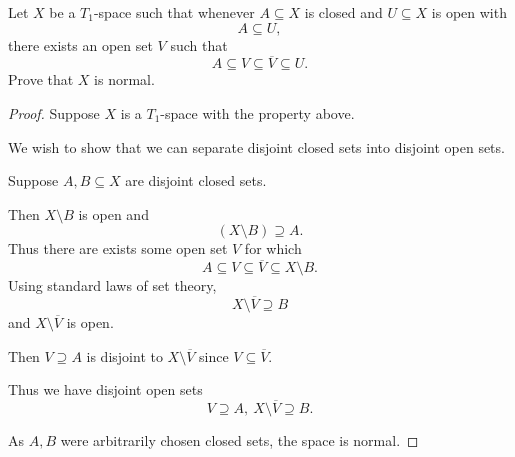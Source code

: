 \documentclass[11pt]{article}
\begin{document}
\begin{prob}
    Let $X$ be a $T_1$-space such that 
    whenever $A \subseteq X$ is closed and 
    $U \subseteq X$ is open with 
    \[
        A \subseteq U, 
    \]
    there exists an open set $V$ such that 
    \[
        A \subseteq V \subseteq \overline V 
        \subseteq U. 
    \]
    Prove that $X$ is normal. 
\end{prob}
\begin{proof}
    Suppose $X$ is a $T_1$-space with the 
    property above. 

    We wish to show that we can separate 
    disjoint closed sets into 
    disjoint open sets.

    Suppose $A,B \subseteq X$ are disjoint 
    closed sets. 
    
    Then $X \setminus B$ is open and 
    \[
        (X\setminus B) \supseteq A. 
    \]
    Thus there are exists some open set 
    $V$ for which 
    \[
        A \subseteq V \subseteq \overline V 
        \subseteq X\setminus B. 
    \]
    Using standard laws of set theory, 
    \[
        X \setminus \overline V 
        \supseteq B 
    \]
    and $X \setminus \overline V$ is open. 

    Then $V \supseteq A$ is disjoint 
    to $X \setminus \overline V$ since $V \subseteq \overline V$. 

    Thus we have disjoint open sets 
    \[
        V \supseteq A, \ X \setminus \overline V \supseteq 
        B. 
    \]
    
    As $A,B$ were arbitrarily chosen closed sets, the 
    space is normal.

\end{proof}
\end{document}
